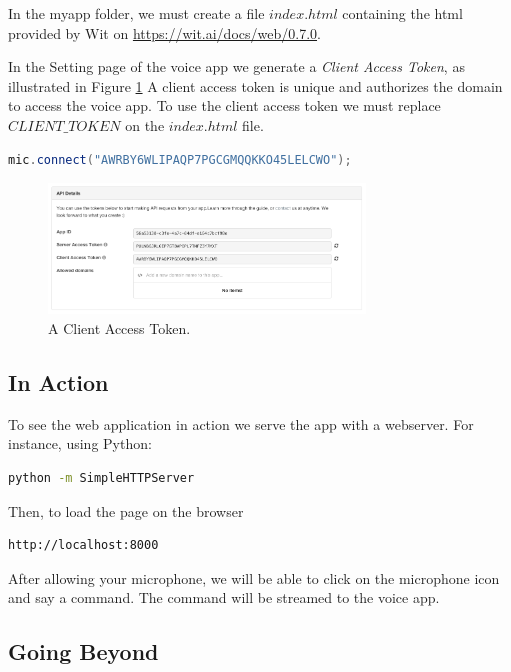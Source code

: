 \documentclass[twoside,11pt]{article}
\begin{document}
In the myapp folder, we must create a file $index.html$ containing the html provided by Wit on \url{https://wit.ai/docs/web/0.7.0}.

In the Setting page of the voice app we generate a \emph{Client Access Token}, as illustrated in Figure \ref{fig:token} 
A client access token is unique and authorizes the domain to access the voice app. 
To use the client access token we must replace $CLIENT\_TOKEN$ on the $index.html$ file.
\begin{lstlisting}[language=java]
	mic.connect("AWRBY6WLIPAQP7PGCGMQQKKO45LELCWO");
\end{lstlisting}


\begin{figure}[!h]
\begin{center}
    \includegraphics[width=0.75\textwidth]{figures/token.png}
    \caption{A Client Access Token.}
    \label{fig:token}
\end{center}
\end{figure}


\subsection{In Action}

To see the web application in action we serve the app with a webserver.
For instance, using Python:
\begin{lstlisting}[language=bash]
	python -m SimpleHTTPServer
\end{lstlisting}
Then, to load the page on the browser
\begin{lstlisting}[language=bash]
	http://localhost:8000
\end{lstlisting}



After allowing your microphone, we will be able to click on the microphone icon and say a command. 
The command will be streamed to the voice app.

\subsection{Going Beyond}
\end{document}
